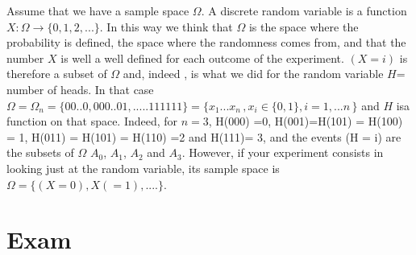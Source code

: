 \documentclass[12pt]{article}
\newcommand{\<}{{\langle \!\! \langle}}
\renewcommand{\>}{{\rangle \!\! \rangle}}
\begin{document}
Assume that we have a sample space $\Omega$. A discrete random variable is a function $X: \Omega \to \{0,1,2,...\}$.  
In this way we think that $\Omega $ is the space where the probability is defined, the space where the randomness comes from, and that the number $X$ is well a well defined for each outcome of the experiment.  $( X = i)$ is  therefore a subset of $\Omega $ and, indeed , is what we did for the random variable $H$= number of heads. In that case $\Omega = \Omega_n = \{00..0,000..01,.....111111\}=\{x_1...x_n\,, x_i\in\{0,1\}, i=1,...n\,\}$ and $H$ isa function on that space. Indeed, for $n=3$, H(000) =0, H(001)=H(101) = H(100) = 1, H(011) = H(101) = H(110) =2 and H(111)= 3, and the events  (H = i) are the subsets of $\Omega $ $A_0$, $A_1$, $A_2$ and $A_3$.
However, if your experiment consists in looking just at the random variable, its sample space is $\Omega = \{ (X = 0), X( =1) , ....\}$. 




\section{Exam}
\end{document}
